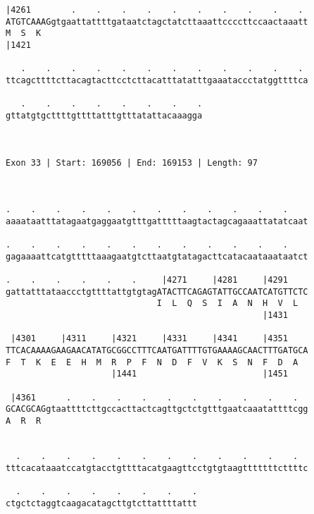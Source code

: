 \documentclass{article}
\begin{document}
\begin{Verbatim}
|4261        .    .    .    .    .    .    .    .    .    . 
ATGTCAAAGgtgaattattttgataatctagctatcttaaattccccttccaactaaatt
M  S  K                                                     
|1421                                                       
  
   .    .    .    .    .    .    .    .    .    .    .    . 
ttcagcttttcttacagtacttcctcttacatttatatttgaaataccctatggttttca
                                                            
   .    .    .    .    .    .    .    .
gttatgtgcttttgttttatttgtttatattacaaagga
                                       
                                       
 
Exon 33 | Start: 169056 | End: 169153 | Length: 97



.    .    .    .    .    .    .    .    .    .    .    .    
aaaataatttatagaatgaggaatgtttgatttttaagtactagcagaaattatatcaat
                                                            
.    .    .    .    .    .    .    .    .    .    .    .    
gagaaaattcatgtttttaaagaatgtcttaatgtatagacttcatacaataaataatct
                                                            
.    .    .    .    .    .     |4271     |4281     |4291    
gattatttataaccctgttttattgtgtagATACTTCAGAGTATTGCCAATCATGTTCTC
                              I  L  Q  S  I  A  N  H  V  L  
                                                   |1431    
  
 |4301     |4311     |4321     |4331     |4341     |4351    
TTCACAAAAGAAGAACATATGCGGCCTTTCAATGATTTTGTGAAAAGCAACTTTGATGCA
F  T  K  E  E  H  M  R  P  F  N  D  F  V  K  S  N  F  D  A  
                     |1441                         |1451    
  
 |4361      .    .    .    .    .    .    .    .    .    .  
GCACGCAGgtaattttcttgccacttactcagttgctctgtttgaatcaaatattttcgg
A  R  R                                                     
                                                            
  
  .    .    .    .    .    .    .    .    .    .    .    .  
tttcacataaatccatgtacctgttttacatgaagttcctgtgtaagtttttttcttttc
                                                            
  .    .    .    .    .    .    .    .
ctgctctaggtcaagacatagcttgtcttattttattt
                                      
                                      
 

\end{Verbatim}
\end{document}

